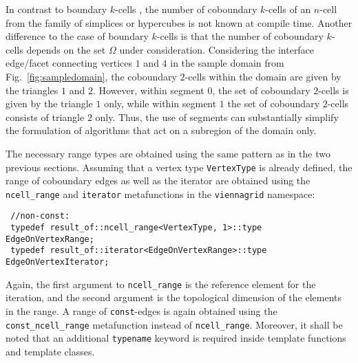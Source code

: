 In contrast to boundary $k$-cells , the number of coboundary $k$-cells of an $n$-cell from the family of simplices or hypercubes is not known at compile time.
Another difference to the case of boundary $k$-cells is that the number of coboundary $k$-cells depends on the set $\Omega$ under consideration.
Considering the interface edge/facet connecting vertices $1$ and $4$ in the sample domain from Fig.~\ref{fig:sampledomain}, the coboundary $2$-cells within the domain are given by the triangles $1$ and $2$.
However, within segment $0$, the set of coboundary $2$-cells is given by the triangle $1$ only, while within segment $1$ the set of coboundary $2$-cells consists of triangle $2$ only.
Thus, the use of segments can substantially simplify the formulation of algorithms that act on a subregion of the domain only.

The necessary range types are obtained using the same pattern as in the two previous sections.
Assuming that a vertex type \lstinline|VertexType| is already defined, the range of coboundary edges as well as the iterator are obtained
using the \lstinline|ncell_range| and \lstinline|iterator| metafunctions in the \lstinline|viennagrid| namespace:
\begin{lstlisting}
 //non-const:
 typedef result_of::ncell_range<VertexType, 1>::type   EdgeOnVertexRange;
 typedef result_of::iterator<EdgeOnVertexRange>::type  EdgeOnVertexIterator;
\end{lstlisting}
Again, the first argument to \lstinline|ncell_range| is the reference element for the iteration, and the second argument is the topological dimension of the elements in the range.
A range of \lstinline|const|-edges is again obtained using the \lstinline|const_ncell_range| metafunction instead of \lstinline|ncell_range|.
Moreover, it shall be noted that an additional \lstinline|typename| keyword is required inside template functions and template classes.

